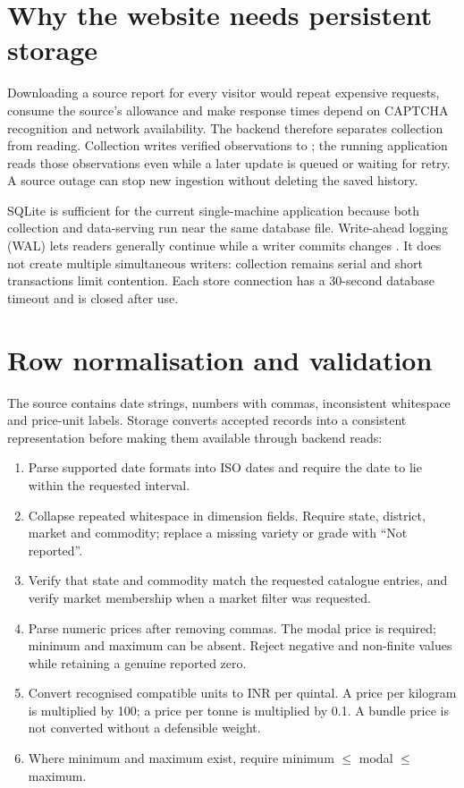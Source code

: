 \documentclass[12pt,a4paper,oneside]{report}
\numberwithin{equation}{chapter}
\numberwithin{figure}{chapter}
\numberwithin{table}{chapter}
\theoremstyle{definition}
\begin{document}
\section{Why the website needs persistent storage}
Downloading a source report for every visitor would repeat expensive requests, consume the source's allowance and make response times depend on CAPTCHA recognition and network availability. The backend therefore separates collection from reading. Collection writes verified observations to ; the running application reads those observations even while a later update is queued or waiting for retry. A source outage can stop new ingestion without deleting the saved history.

SQLite is sufficient for the current single-machine application because both collection and data-serving run near the same database file. Write-ahead logging (WAL) lets readers generally continue while a writer commits changes \cite{sqlitewal}. It does not create multiple simultaneous writers: collection remains serial and short transactions limit contention. Each store connection has a 30-second database timeout and is closed after use.

\section{Row normalisation and validation}
The source contains date strings, numbers with commas, inconsistent whitespace and price-unit labels. Storage converts accepted records into a consistent representation before making them available through backend reads:
\begin{enumerate}
  \item Parse supported date formats into ISO dates and require the date to lie within the requested interval.
  \item Collapse repeated whitespace in dimension fields. Require state, district, market and commodity; replace a missing variety or grade with ``Not reported''.
  \item Verify that state and commodity match the requested catalogue entries, and verify market membership when a market filter was requested.
  \item Parse numeric prices after removing commas. The modal price is required; minimum and maximum can be absent. Reject negative and non-finite values while retaining a genuine reported zero.
  \item Convert recognised compatible units to INR per quintal. A price per kilogram is multiplied by 100; a price per tonne is multiplied by 0.1. A bundle price is not converted without a defensible weight.
  \item Where minimum and maximum exist, require minimum $\le$ modal $\le$ maximum.
\end{enumerate}
\end{document}

